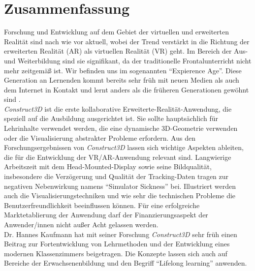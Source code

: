 \documentclass[deutsch]{llncs}
\begin{document}
\section{Zusammenfassung}
Forschung und Entwicklung auf dem Gebiet der virtuellen und erweiterten Realität sind nach wie vor aktuell, wobei der Trend verstärkt in die Richtung der erweiterten Realität (AR) als virtuellen Realität (VR) geht. Im Bereich der Aus- und Weiterbildung sind sie signifikant, da der traditionelle Frontalunterricht nicht mehr zeitgemäß ist. Wir befinden uns im sogenannten ``Expierence Age''. Diese Generation an Lernenden kommt bereits sehr früh mit neuen Medien als auch dem Internet in Kontakt und lernt anders als die früheren Generationen gewöhnt sind \cite{Hu-Au}. \\

\emph{Construct3D} ist die erste kollaborative Erweiterte-Realität-Anwendung, die speziell auf die Ausbildung ausgerichtet ist. Sie sollte hauptsächlich für Lehrinhalte verwendet werden, die eine dynamische 3D-Geometrie verwenden oder die Visualisierung abstrakter Probleme erfordern. Aus den Forschungsergebnissen von \emph{Construct3D} lassen sich wichtige Aspekten ableiten, die für die Entwicklung der VR/AR-Anwendung relevant sind. Langwierige Arbeitszeit mit dem Head-Mounted-Display sowie seine Bildqualität, insbesondere die Verzögerung und Qualität der Tracking-Daten tragen zur negativen Nebenwirkung namens ``Simulator Sickness'' bei. Illustriert werden auch die Visualisierungstechniken und wie sehr die technischen Probleme die Benutzerfreundlichkeit beeinflussen können. Für eine erfolgreiche Marktetablierung der Anwendung darf der Finanzierungsaspekt der Anwender/innen nicht außer Acht gelassen werden.\\

Dr. Hannes Kaufmann hat mit seiner Forschung \emph{Construct3D} sehr früh einen Beitrag zur Fortentwicklung von Lehrmethoden und der Entwicklung eines modernen Klassenzimmers beigetragen. Die Konzepte lassen sich auch auf Bereiche der Erwachsenenbildung und den Begriff ``Lifelong learning'' anwenden. \\

\label{sec:bib}

\printbibliography
\end{document}
